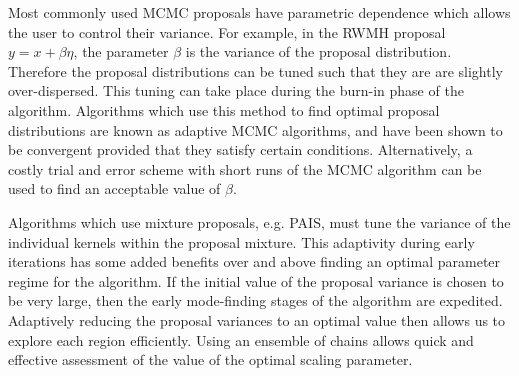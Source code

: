 \documentclass[final]{siamltex}
\begin{document}

Most commonly used MCMC proposals have parametric dependence which
allows the user to control their variance. For example, in the RWMH
proposal $y = x + \beta \eta$, the parameter $\beta$ is the variance
of the proposal distribution. Therefore the proposal distributions can
be tuned such that they are are slightly over-dispersed. This tuning
can take place during the burn-in phase of the algorithm. Algorithms
which use this method to find optimal proposal distributions are known
as adaptive MCMC algorithms, and have been shown to be convergent
provided that they satisfy certain
conditions\cite{roberts2007coupling,roberts2009examples}.
Alternatively, a costly trial and error scheme with short runs of the
MCMC algorithm can be used to find an acceptable value of $\beta$.

Algorithms which use mixture proposals, e.g. PAIS, must tune the
variance of the individual kernels within the proposal mixture. This
adaptivity during early iterations has some added benefits over and above
finding an optimal parameter regime for the algorithm. If the initial
value of the proposal variance is chosen to be very large, then the early
mode-finding stages of the algorithm are expedited. Adaptively
reducing the proposal variances to an optimal value then allows us to
explore each region efficiently. Using an ensemble of chains allows
quick and effective assessment of the value of the optimal scaling
parameter.

\end{document}
